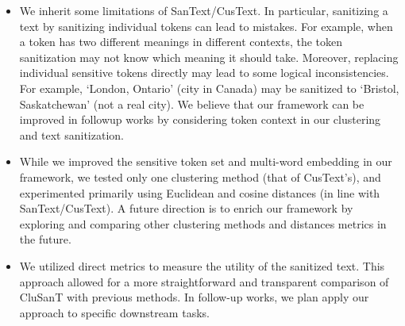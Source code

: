 \documentclass[11pt]{article}
\newcommand{\clusant}{CluSanT\xspace}
\begin{document}
\begin{itemize}
\setlength\itemsep{0em}
    \item We inherit some limitations of SanText/CusText. In particular, sanitizing a text by sanitizing individual tokens can lead to mistakes. For example, when a token has two different meanings in different contexts, the token sanitization may not know which meaning it should take. Moreover, replacing individual sensitive tokens directly may lead to some logical inconsistencies. For example, `London, Ontario' (city in Canada) may be sanitized to `Bristol, Saskatchewan' (not a real city).  
    We believe that our framework can be improved in followup works by considering token context in our clustering and text sanitization. 
    \item While we improved the sensitive token set and multi-word embedding in our framework, we tested only one clustering method (that of CusText's), and experimented primarily using Euclidean and cosine distances (in line with SanText/CusText). A future direction is to enrich our framework by exploring and comparing other clustering methods and distances metrics in the future. %
    \item We utilized direct metrics to measure the utility of the sanitized text. %
    This approach allowed for a more straightforward and transparent comparison of \clusant with previous methods. In follow-up works, we plan apply our approach to specific downstream tasks.
\end{itemize}













%
% 

\appendix


\end{document}
